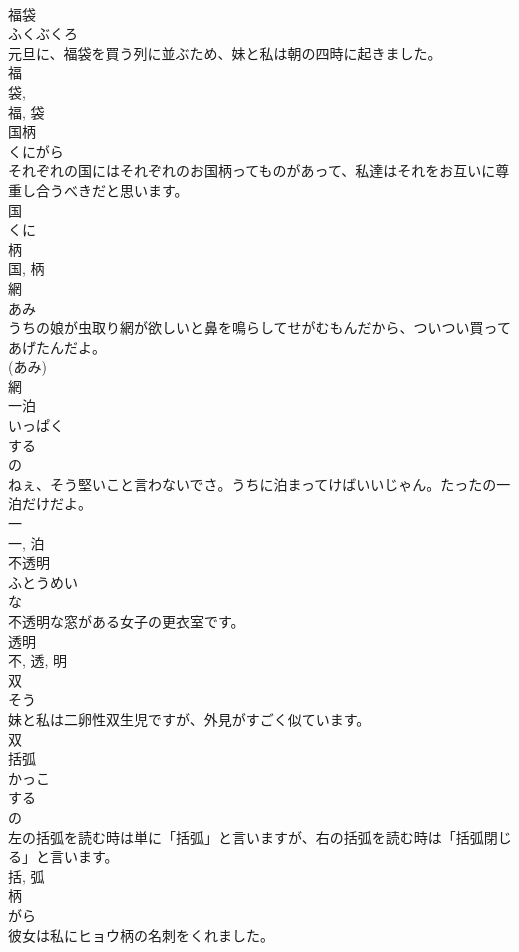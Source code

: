 \documentclass[8pt]{extreport}
\begin{document}
\begin{CJK}{UTF8}{min}
\\	福袋	
\\	ふくぶくろ	
\\	元旦に、福袋を買う列に並ぶため、妹と私は朝の四時に起きました。	
\\	福 
\\	袋, 
\\	福, 袋	
\\	国柄	
\\	くにがら	
\\	それぞれの国にはそれぞれのお国柄ってものがあって、私達はそれをお互いに尊重し合うべきだと思います。	
\\	国 
\\	くに 
\\	柄 
\\	国, 柄	
\\	網	
\\	あみ	
\\	うちの娘が虫取り網が欲しいと鼻を鳴らしてせがむもんだから、ついつい買ってあげたんだよ。	
\\	(あみ) 
\\	網	
\\	一泊	
\\	いっぱく	
\\	する 
\\	の 
\\	ねぇ、そう堅いこと言わないでさ。うちに泊まってけばいいじゃん。たったの一泊だけだよ。	
\\	一 
\\	一, 泊	
\\	不透明	
\\	ふとうめい	
\\	な 
\\	不透明な窓がある女子の更衣室です。	
\\	透明 
\\	不, 透, 明	
\\	双	
\\	そう	
\\	妹と私は二卵性双生児ですが、外見がすごく似ています。	
\\	双	
\\	括弧	
\\	かっこ	
\\	する 
\\	の 
\\	左の括弧を読む時は単に「括弧」と言いますが、右の括弧を読む時は「括弧閉じる」と言います。	
\\	括, 弧	
\\	柄	
\\	がら	
\\	彼女は私にヒョウ柄の名刺をくれました。	

\end{CJK}
\end{document}
